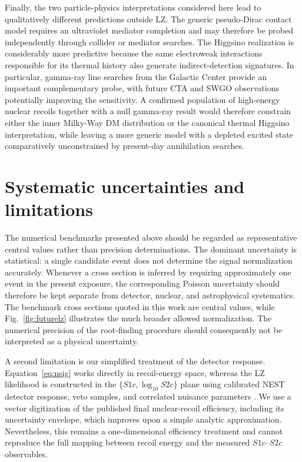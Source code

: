 \documentclass[aps,prd,reprint,superscriptaddress,nofootinbib,longbibliography,floatfix]{revtex4-2}
\begin{document}
Finally, the two particle-physics interpretations considered here lead to qualitatively different predictions outside LZ. The generic pseudo-Dirac contact model requires an ultraviolet mediator completion and may therefore be probed independently through collider or mediator searches. The Higgsino realization is considerably more predictive because the same electroweak interactions responsible for its thermal history also generate indirect-detection signatures. In particular, gamma-ray line searches from the Galactic Center provide an important complementary probe, with future CTA and SWGO observations potentially improving the sensitivity. A confirmed population of high-energy nuclear recoils together with a null gamma-ray result would therefore constrain either the inner Milky-Way DM distribution or the canonical thermal Higgsino interpretation, while leaving a more generic model with a depleted excited state comparatively unconstrained by present-day annihilation searches.


\section{Systematic uncertainties and limitations}

The numerical benchmarks presented above should be regarded as representative central values rather than precision determinations. The dominant uncertainty is statistical: a single candidate event does not determine the signal normalization accurately. Whenever a cross section is inferred by requiring approximately one event in the present exposure, the corresponding Poisson uncertainty should therefore be kept separate from detector, nuclear, and astrophysical systematics. The benchmark cross sections quoted in this work are central values, while Fig.~\ref{fig:futurelz} illustrates the much broader allowed normalization. The numerical precision of the root-finding procedure should consequently not be interpreted as a physical uncertainty.

A second limitation is our simplified treatment of the detector response. Equation~\eqref{eq:nsig} works directly in recoil-energy space, whereas the LZ likelihood is constructed in the $\{S1c,\log_{10}S2c\}$ plane using calibrated NEST detector response, veto samples, and correlated nuisance parameters \cite{LZ2026Extended}. We use a vector digitization of the published final nuclear-recoil efficiency, including its uncertainty envelope, which improves upon a simple analytic approximation. Nevertheless, this remains a one-dimensional efficiency treatment and cannot reproduce the full mapping between recoil energy and the measured $S1c$--$S2c$ observables.
\end{document}
